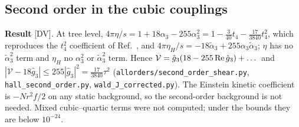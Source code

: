 \subsection{Second order in the cubic couplings}
\textbf{Result} [DV]. At tree level, $4\pi\eta/s=1+18\alpha_3-255\alpha_3^2=1-\tfrac3{40}t_4-\tfrac{17}{3840}t_4^2$, which reproduces
the $t_4^2$ coefficient of Ref.~\cite{Li:2019auk}, and $4\pi\eta_H/s=-18\tilde\alpha_3+255\alpha_3\tilde\alpha_3$; $\eta$ has no
$\tilde\alpha_3^2$ term and $\eta_H$ no $\alpha_3^2$ or $\tilde\alpha_3^2$ term. Hence $\mathcal V=\hat g_3(18-255\,{\rm Re}\,\hat g_3)+\dots$
and $|\mathcal V-18\hat g_3|\le255|\hat g_3|^2=\tfrac{17}{3840}\tau^2$ (\texttt{allorders/second\_order\_shear.py},
\texttt{hall\_second\_order.py}, \texttt{wald\_J\_corrected.py}). The Einstein kinetic coefficient is $-Nr^2f/2$ on any static
background, so the second-order background is not needed. Mixed cubic--quartic terms were not computed; under the bounds they
are below $10^{-24}$.

